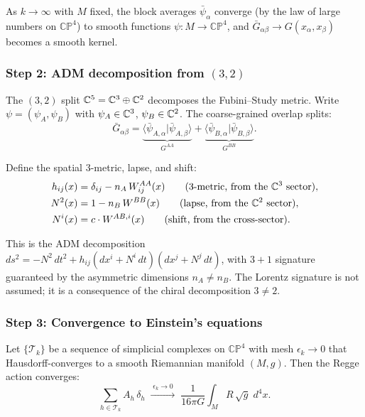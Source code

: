 As $k \to \infty$ with $M$ fixed, the block averages $\bar{\psi}_\alpha$ converge (by the law of large numbers on $\mathbb{CP}^4$) to smooth functions $\psi: M \to \mathbb{CP}^4$, and $\bar{G}_{\alpha\beta} \to G(x_\alpha, x_\beta)$ becomes a smooth kernel.

\subsubsection{Step 2: ADM decomposition from $(3,2)$}

The $(3,2)$ split $\mathbb{C}^5 = \mathbb{C}^3 \oplus \mathbb{C}^2$ decomposes the Fubini--Study metric.  Write $\psi = (\psi_A, \psi_B)$ with $\psi_A \in \mathbb{C}^3$, $\psi_B \in \mathbb{C}^2$.  The coarse-grained overlap splits:
\begin{equation}
\bar{G}_{\alpha\beta} = \underbrace{\langle\bar{\psi}_{A,\alpha}|\bar{\psi}_{A,\beta}\rangle}_{G^{AA}} + \underbrace{\langle\bar{\psi}_{B,\alpha}|\bar{\psi}_{B,\beta}\rangle}_{G^{BB}}.
\end{equation}

Define the spatial 3-metric, lapse, and shift:
\begin{align}
h_{ij}(x) &= \delta_{ij} - n_A\,W^{AA}_{ij}(x) \qquad (3\text{-metric, from the }\mathbb{C}^3\text{ sector}), \\
N^2(x) &= 1 - n_B\,W^{BB}(x) \qquad (\text{lapse, from the }\mathbb{C}^2\text{ sector}), \\
N^i(x) &= c \cdot W^{AB,i}(x) \qquad (\text{shift, from the cross-sector}).
\end{align}

This is the ADM decomposition $ds^2 = -N^2\,dt^2 + h_{ij}(dx^i + N^i\,dt)(dx^j + N^j\,dt)$, with $3+1$ signature guaranteed by the asymmetric dimensions $n_A \ne n_B$.  The Lorentz signature is not assumed; it is a consequence of the chiral decomposition $3 \ne 2$.

\subsubsection{Step 3: Convergence to Einstein's equations}

\begin{theorem}
\label{thm:regge_convergence}
Let $\{\mathcal{T}_k\}$ be a sequence of simplicial complexes on $\mathbb{CP}^4$ with mesh $\epsilon_k \to 0$ that Hausdorff-converges to a smooth Riemannian manifold $(M, g)$.  Then the Regge action converges:
\begin{equation}
\sum_{h \in \mathcal{T}_k} A_h\,\delta_h \;\xrightarrow{\;\epsilon_k \to 0\;}\; \frac{1}{16\pi G}\int_M R\,\sqrt{g}\;d^4x.
\end{equation}
\end{theorem}

